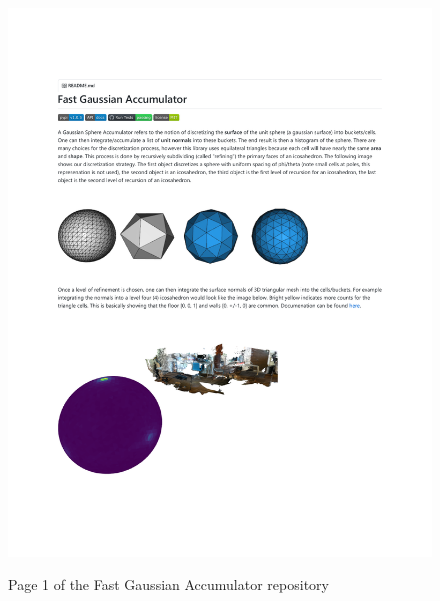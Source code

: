 \begin{figure}[h!]
    \centering\includegraphics[page=1, trim=1.2in 1.2in 1.2in 1.15in, width=.82\linewidth]{appendix_1/imgs/FastGAReadme.pdf}
    \label{fig:apx1_fg1}
    \caption{Page 1 of the Fast Gaussian Accumulator repository} 
\end{figure}

